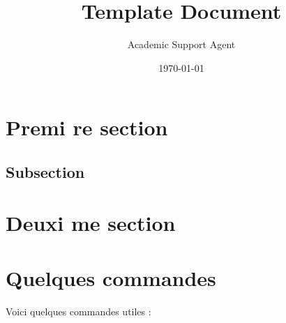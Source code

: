 \documentclass{article}
\title{Template Document}
\author{Academic Support Agent}
\date{\today}
\begin{document}
\maketitle





        
\fairemarges %
\fairepagedegarde %
\tabledematieres %



\section{Premi re section} 

\lipsum[3-4]%

\subsection{Subsection}

\lipsum[3-4] %

\section{Deuxi me section}

\lipsum[3-5] %


\section{Quelques commandes}

Voici quelques commandes utiles :

\end{document}
